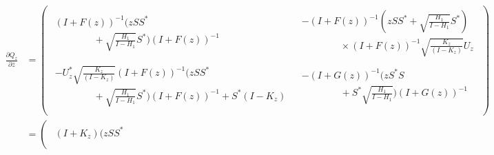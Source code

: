 \documentclass{amsart}
\begin{document}
\begin{align*}
\frac{\partial Q_{z}}{\partial \overline{z}} &=
\left(
                                      \begin{array}{cc}
                                         \begin{array}{c}
                                           (I + F(z))^{-1}(zSS^{*}  \\
                                           \qquad \qquad + \sqrt{\frac{H_1}{I - H_1}}S^{*})(I + F(z))^{-1}
                                         \end{array}
                                         & \begin{array}{c}
                                             -(I + F(z))^{-1}(zSS^{*}+ \sqrt{\frac{H_1}{I - H_1}}S^{*})   \\
                                             \qquad \qquad \times(I + F(z))^{-1}\sqrt{\frac{K_{z}}{(I-K_{z})}}U_{z}
                                           \end{array}
                                          \\
                                        \begin{array}{c}
                                         -U_{z}^{*}\sqrt{\frac{K_{z}}{(I-K_{z})}}(I + F(z))^{-1}(zSS^{*}  \\
                                         \qquad \qquad  + \sqrt{\frac{H_1}{I - H_1}}S^{*})(I + F(z))^{-1} + S^{*}(I - K_z)
                                        \end{array}
                                        & \begin{array}{c}
                                           - (I + G(z))^{-1}(zS^{*}S  \\
                                             \qquad \qquad + S^{*}\sqrt{\frac{H_1}{I - H_1}} )(I + G(z))^{-1}
                                          \end{array}
                                         \\
                                      \end{array}
                                    \right)\\
                                    &=\left(
                                      \begin{array}{cc}
                                         \begin{array}{c}
                                           (I + K_z)(zSS^{*}  \\

\end{array}
\end{array}
\end{align*}
\end{document}
